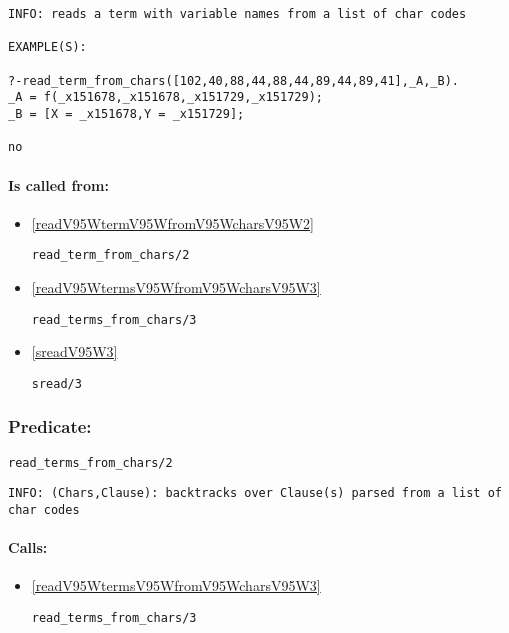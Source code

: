 {\small \begin{verbatim}
INFO: reads a term with variable names from a list of char codes

EXAMPLE(S):

?-read_term_from_chars([102,40,88,44,88,44,89,44,89,41],_A,_B).
_A = f(_x151678,_x151678,_x151729,_x151729);
_B = [X = _x151678,Y = _x151729];

no

\end{verbatim}}
\paragraph{Is called from:} 
\begin{itemize}
\item \ref{readV95WtermV95WfromV95WcharsV95W2} 
\begin{verbatim}
read_term_from_chars/2
\end{verbatim}

\item \ref{readV95WtermsV95WfromV95WcharsV95W3} 
\begin{verbatim}
read_terms_from_chars/3
\end{verbatim}

\item \ref{sreadV95W3} 
\begin{verbatim}
sread/3
\end{verbatim}

\end{itemize}

\subsubsection{Predicate:} \label{readV95WtermsV95WfromV95WcharsV95W2}

\begin{verbatim}
read_terms_from_chars/2
\end{verbatim}

{\small \begin{verbatim}
INFO: (Chars,Clause): backtracks over Clause(s) parsed from a list of char codes

\end{verbatim}}
\paragraph{Calls:} 
\begin{itemize}
\item \ref{readV95WtermsV95WfromV95WcharsV95W3} 
\begin{verbatim}
read_terms_from_chars/3
\end{verbatim}

\end{itemize}

